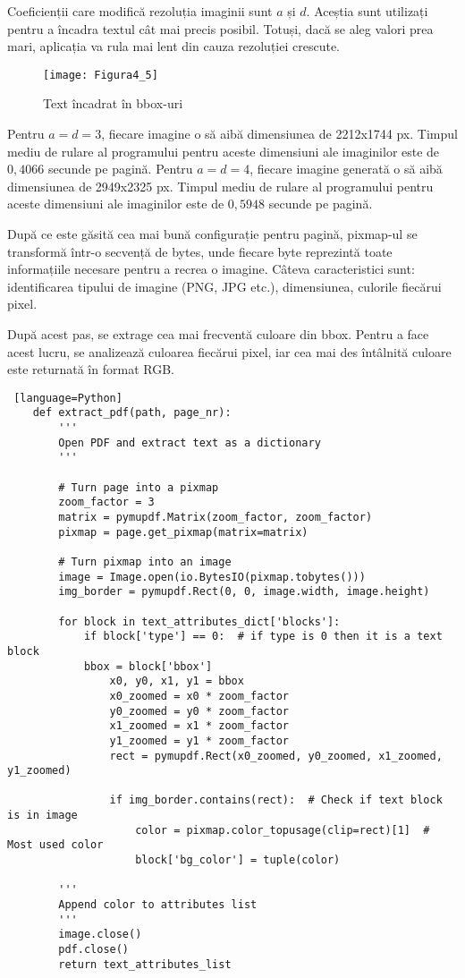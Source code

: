 Coeficienții care modifică rezoluția imaginii sunt $a$ și $d$. Aceștia sunt utilizați pentru a încadra textul cât mai precis posibil. Totuși, dacă se aleg valori prea mari, aplicația va rula mai lent din cauza rezoluției crescute.

\begin{figure}[H]
	\centering
	\texttt{[image: Figura4\_5]}
	\caption{Text încadrat în bbox-uri}
	\label{fig:Figura4_5}
\end{figure}

Pentru $a = d = 3$, fiecare imagine o să aibă dimensiunea de 2212x1744 px. Timpul mediu de rulare al programului pentru aceste dimensiuni ale imaginilor este de $0,4066$ secunde pe pagină. Pentru $a = d = 4$, fiecare imagine generată o să aibă dimensiunea de 2949x2325 px. Timpul mediu de rulare al programului pentru aceste dimensiuni ale imaginilor este de $0,5948$ secunde pe pagină.

După ce este găsită cea mai bună configurație pentru pagină, pixmap-ul se transformă într-o secvență de bytes, unde fiecare byte reprezintă toate informațiile necesare pentru a recrea o imagine. Câteva caracteristici sunt: identificarea tipului de imagine (PNG, JPG etc.), dimensiunea, culorile fiecărui pixel.

După acest pas, se extrage cea mai frecventă culoare din bbox. Pentru a face acest lucru, se analizează culoarea fiecărui pixel, iar cea mai des întâlnită culoare este returnată în format RGB.
\vspace{3em}
\begin{lstlisting} [language=Python]
	def extract_pdf(path, page_nr): 
		'''
		Open PDF and extract text as a dictionary
		'''
		
		# Turn page into a pixmap
		zoom_factor = 3
		matrix = pymupdf.Matrix(zoom_factor, zoom_factor)
		pixmap = page.get_pixmap(matrix=matrix)
		
		# Turn pixmap into an image
		image = Image.open(io.BytesIO(pixmap.tobytes()))
		img_border = pymupdf.Rect(0, 0, image.width, image.height)
		
		for block in text_attributes_dict['blocks']:
			if block['type'] == 0:  # if type is 0 then it is a text block
			bbox = block['bbox']
				x0, y0, x1, y1 = bbox
				x0_zoomed = x0 * zoom_factor
				y0_zoomed = y0 * zoom_factor
				x1_zoomed = x1 * zoom_factor
				y1_zoomed = y1 * zoom_factor
				rect = pymupdf.Rect(x0_zoomed, y0_zoomed, x1_zoomed, y1_zoomed)
				
				if img_border.contains(rect):  # Check if text block is in image
					color = pixmap.color_topusage(clip=rect)[1]  # Most used color
					block['bg_color'] = tuple(color)
		
		'''
		Append color to attributes list
		'''
		image.close()
		pdf.close()
		return text_attributes_list
\end{lstlisting}


